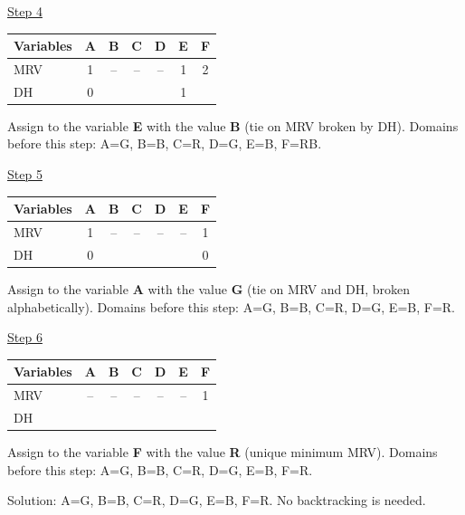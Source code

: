 \documentclass[11pt,a4paper]{article}
\begin{document}
\begin{solbox}
\underline{Step 4}\par\begin{center}\small \begin{tabular}{|l|c|c|c|c|c|c|}\hline Variables & \textbf{A} & \textbf{B} & \textbf{C} & \textbf{D} & \textbf{E} & \textbf{F}\\ \hline MRV & \textcolor{blue!60!black}{1} & -- & -- & -- & \textcolor{blue!60!black}{1} & \textcolor{blue!60!black}{2}\\ \hline DH & \textcolor{blue!60!black}{0} &  &  &  & \textcolor{blue!60!black}{1} & \\ \hline\end{tabular}\end{center}Assign to the variable \textbf{E} with the value \textbf{B} (tie on MRV broken by DH). Domains before this step: A=G, B=B, C=R, D=G, E=B, F=RB.\par
\underline{Step 5}\par\begin{center}\small \begin{tabular}{|l|c|c|c|c|c|c|}\hline Variables & \textbf{A} & \textbf{B} & \textbf{C} & \textbf{D} & \textbf{E} & \textbf{F}\\ \hline MRV & \textcolor{blue!60!black}{1} & -- & -- & -- & -- & \textcolor{blue!60!black}{1}\\ \hline DH & \textcolor{blue!60!black}{0} &  &  &  &  & \textcolor{blue!60!black}{0}\\ \hline\end{tabular}\end{center}Assign to the variable \textbf{A} with the value \textbf{G} (tie on MRV and DH, broken alphabetically). Domains before this step: A=G, B=B, C=R, D=G, E=B, F=R.\par
\underline{Step 6}\par\begin{center}\small \begin{tabular}{|l|c|c|c|c|c|c|}\hline Variables & \textbf{A} & \textbf{B} & \textbf{C} & \textbf{D} & \textbf{E} & \textbf{F}\\ \hline MRV & -- & -- & -- & -- & -- & \textcolor{blue!60!black}{1}\\ \hline DH &  &  &  &  &  & \\ \hline\end{tabular}\end{center}Assign to the variable \textbf{F} with the value \textbf{R} (unique minimum MRV). Domains before this step: A=G, B=B, C=R, D=G, E=B, F=R.\par Solution: A=G, B=B, C=R, D=G, E=B, F=R. No backtracking is needed.
\end{solbox}
\end{document}
